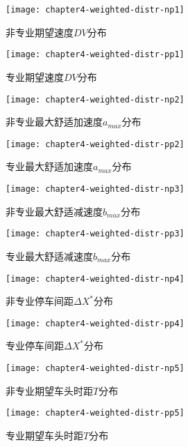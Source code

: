 \begin{figure}[htbp]
\begin{minipage}[t]{0.225\linewidth}
\centering
\texttt{[image: chapter4-weighted-distr-np1]}
\caption{非专业期望速度$DV$分布}
\label{weighted-distr-np1}
\end{minipage}%
\hspace*{0.03\linewidth}
\begin{minipage}[t]{0.225\linewidth}
\centering
\texttt{[image: chapter4-weighted-distr-pp1]}
\caption{专业期望速度$DV$分布}
\label{weighted-distr-pp1}
\end{minipage}
\hspace*{0.03\linewidth}
\begin{minipage}[t]{0.225\linewidth}
\centering
\texttt{[image: chapter4-weighted-distr-np2]}
\caption{非专业最大舒适加速度$a_{max}$分布}
\label{weighted-distr-np2}
\end{minipage}%
\hspace*{0.03\linewidth}
\begin{minipage}[t]{0.225\linewidth}
\centering
\texttt{[image: chapter4-weighted-distr-pp2]}
\caption{专业最大舒适加速度$a_{max}$分布}
\label{weighted-distr-pp2}
\end{minipage}
\begin{minipage}[t]{0.225\linewidth}
\centering
\texttt{[image: chapter4-weighted-distr-np3]}
\caption{非专业最大舒适减速度$b_{max}$分布}
\label{weighted-distr-np3}
\end{minipage}%
\hspace*{0.03\linewidth}
\begin{minipage}[t]{0.225\linewidth}
\centering
\texttt{[image: chapter4-weighted-distr-pp3]}
\caption{专业最大舒适减速度$b_{max}$分布}
\label{weighted-distr-pp3}
\end{minipage}
\hspace*{0.03\linewidth}
\begin{minipage}[t]{0.225\linewidth}
\centering
\texttt{[image: chapter4-weighted-distr-np4]}
\caption{非专业停车间距$\Delta X^*$分布}
\label{weighted-distr-np4}
\end{minipage}%
\hspace*{0.03\linewidth}
\begin{minipage}[t]{0.225\linewidth}
\centering
\texttt{[image: chapter4-weighted-distr-pp4]}
\caption{专业停车间距$\Delta X^*$分布}
\label{weighted-distr-pp4}
\end{minipage}
\begin{minipage}[t]{0.225\linewidth}
\centering
\texttt{[image: chapter4-weighted-distr-np5]}
\caption{非专业期望车头时距$T$分布}
\label{weighted-distr-np5}
\end{minipage}%
\hspace*{0.03\linewidth}
\begin{minipage}[t]{0.225\linewidth}
\centering
\texttt{[image: chapter4-weighted-distr-pp5]}
\caption{专业期望车头时距$T$分布}
\label{weighted-distr-pp5}
\end{minipage}
\end{figure}

